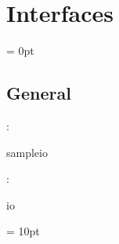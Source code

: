 
\section{Interfaces} 


\parskip = 0pt

\vspace{3mm} \subsection*{General}

: 

sampleio
\vspace{2mm}

: 

io
\vspace{2mm}

\vspace{5mm}\parskip = 10pt 

